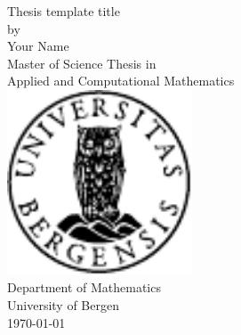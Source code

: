 \documentclass[12pt, a4paper]{report}
\begin{document}
	\pagestyle{empty}
	\begin{center}
		
	{\Huge \sffamily Thesis template title}\\ \vspace*{1.5em}
	{\large by \\ \vspace*{0.25em} \Large Your Name}\\ \vspace*{3.5em}
	{\Large Master of Science Thesis in \\ \vspace*{0.2em}
		Applied and Computational Mathematics }\\ \vspace*{3.5em}
	{\includegraphics[width=5.5cm]{../figs/UiB_logo.pdf}} \\ \vspace*{3.5em}
	{\Large Department of Mathematics \\ \vspace*{0.2em}
		University of Bergen }\\ \vspace*{3.5em}
	{\large \printdayoff\today }
	\end{center}
\end{document}
